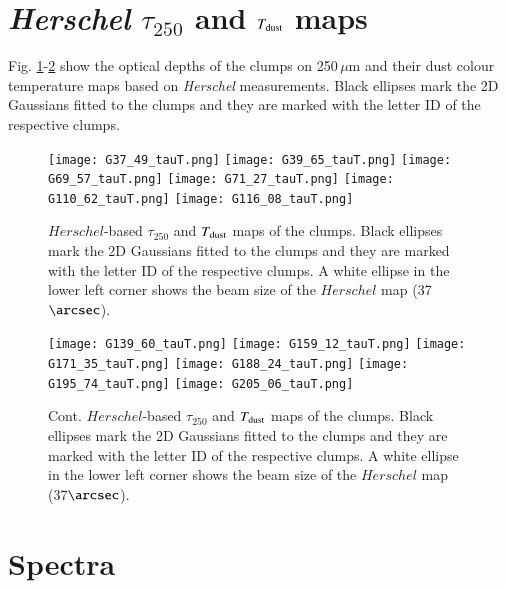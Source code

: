 \documentclass[printer]{aa}
\begin{document}
\begin{appendix}
\section{\textit{Herschel} $\tau_{250}$ and $T_{\rm dust}$ maps}

Fig. \ref{herschel1}-\ref{herschel2} show the optical depths of the clumps on 250\,$\mu$m and their dust colour temperature maps based on \textit{Herschel} measurements. Black ellipses mark the 2D Gaussians fitted to the clumps and they are marked with the letter ID of the respective clumps.

 \begin{figure*}[th]
 	\centering		
 		\texttt{[image: G37\_49\_tauT.png]}
 		\texttt{[image: G39\_65\_tauT.png]}
 		\texttt{[image: G69\_57\_tauT.png]}
 		\texttt{[image: G71\_27\_tauT.png]}
 		\texttt{[image: G110\_62\_tauT.png]}  
        \texttt{[image: G116\_08\_tauT.png]}
       \caption{$Herschel$-based $\tau_{250}$ and $T_{\rm dust}$ maps of the clumps. Black ellipses mark the 2D Gaussians fitted to the clumps and they are marked with the letter ID of the respective clumps. A white ellipse in the lower left corner shows the beam size of the $Herschel$ map (37$\arcsec$).}
 	\label{herschel1}
 \end{figure*}
 
 \begin{figure*}[th]
 \centering
        \texttt{[image: G139\_60\_tauT.png]}  
        \texttt{[image: G159\_12\_tauT.png]}  
        \texttt{[image: G171\_35\_tauT.png]}  
        \texttt{[image: G188\_24\_tauT.png]}  
        \texttt{[image: G195\_74\_tauT.png]}  
        \texttt{[image: G205\_06\_tauT.png]}
      \caption{Cont. $Herschel$-based $\tau_{250}$ and $T_{\rm dust}$ maps of the clumps. Black ellipses mark the 2D Gaussians fitted to the clumps and they are marked with the letter ID of the respective clumps. A white ellipse in the lower left corner shows the beam size of the $Herschel$ map (37$\arcsec$).}
 	\label{herschel2}
 \end{figure*}

\section{Spectra}


\end{appendix}
\end{document}
